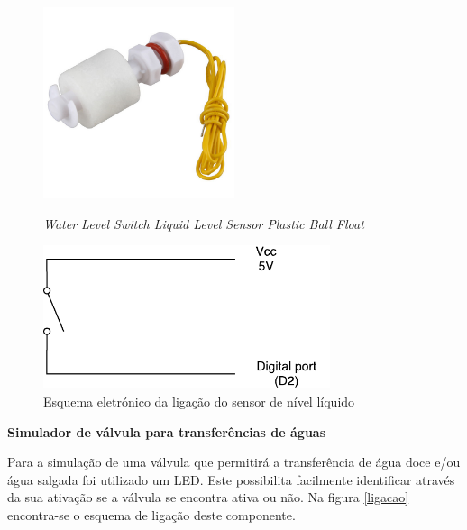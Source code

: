 \begin{figure}[h]
	\centering
	\begin{minipage}[b]{0.49\textwidth}
		\centering
		\includegraphics[width=0.5\textwidth]{img/hardware/liquido.JPG}
		\caption{\textit{Water Level Switch Liquid Level Sensor Plastic Ball Float}}
		\label{levelimg}
	\end{minipage}
	\hfill
	\begin{minipage}[b]{0.49\textwidth}
		\centering
		\includegraphics[width=0.75\textwidth]{img/hardware/sw_esquema.pdf}
		\caption{Esquema eletrónico da ligação do sensor de nível líquido}
		\label{esquem-liquido}
	\end{minipage}
\end{figure}



\textbf{Simulador de válvula para transferências de águas}

Para a simulação de uma válvula que permitirá a transferência de água doce e/ou água salgada foi utilizado um \ac{LED}. Este possibilita facilmente identificar através da sua ativação se a válvula se encontra ativa ou não. Na figura \ref{ligacao} encontra-se o esquema de ligação deste componente. 


